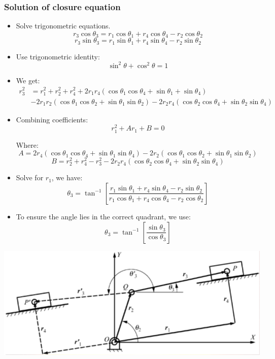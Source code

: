 \documentclass[11pt]{article}
\begin{document}
\subsubsection{Solution of closure equation}
\label{sec:org9ccc7a6}
\begin{itemize}
\item Solve trigonometric equations.
\[r_3 \cos \theta_3 = r_1 \cos \theta_1 + r_4 \cos \theta_4 - r_2 \cos \theta_2\]
\[r_3 \sin \theta_3 = r_1 \sin \theta_1 + r_4 \sin \theta_4 - r_2 \sin \theta_2\]
\item Use trigonometric identity:
\[\sin^2 \theta + \cos^2 \theta = 1\]
\item We get:
\begin{align*}
r_3^2 &= r_1^2 + r_2^2 + r_4^2 + 2r_1 r_4 (\cos \theta_1 \cos \theta_4 + \sin \theta_1 + \sin \theta_4) \\
&- 2r_1 r_2 (\cos \theta_1 \cos \theta_2 + \sin \theta_1 \sin \theta_2) - 2r_2 r_4 (\cos \theta_2 \cos \theta_4 + \sin \theta_2 \sin \theta_4)
\end{align*}
\item Combining coefficients:
\[r_1^2 + Ar_1 + B = 0\]

Where:
\[A = 2 r_4 (\cos \theta_1 \cos \theta_4 + \sin \theta_1 \sin \theta_4) - 2r_2 (\cos \theta_1 \cos \theta_2 + \sin \theta_1 \sin \theta_2)\]
\[B = r_2^2 + r_4^2 - r_3^2 - 2r_2 r_4 (\cos \theta_2 \cos \theta_4 + \sin \theta_2 \sin \theta_4)\]
\item Solve for \(r_1\), we have:
\[\theta_3 = \tan^{-1} \left[\frac{r_1 \sin \theta_1 + r_4 \sin \theta_4 - r_2 \sin \theta_2}{r_1 \cos \theta_1 + r_4 \cos \theta_4 - r_2 \cos \theta_2} \right]\]
\item To ensure the angle lies in the correct quadrant, we use:
\[\theta_3 = \tan^{-1} \left[\frac{\sin \theta_3}{\cos \theta_3} \right]\]
\end{itemize}

\begin{center}
\includegraphics[width=.9\linewidth]{./images/slider-crank-mechanism-vector-loop-example-closure-equation.png}
\end{center}
\end{document}
